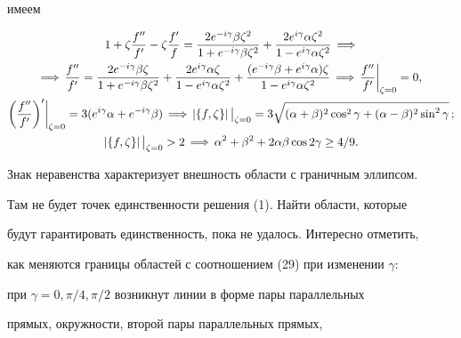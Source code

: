 имеем


\begin{gather}


1+\zeta\frac{f''}{f'}-\zeta\frac{f'}{f}=


\frac{2e^{-i\gamma}\beta\zeta^2}{1+e^{-i\gamma}\beta\zeta^2}+


\frac{2e^{i\gamma}\alpha\zeta^2}{1-e^{i\gamma}\alpha\zeta^2}


\,\Longrightarrow\, \notag\\


%


\Longrightarrow\,\frac{f''}{f'}=\frac{2e^{-i\gamma}\beta\zeta}


{1+e^{-i\gamma}\beta\zeta^2}+


\frac{2e^{i\gamma}\alpha\zeta}{1-e^{i\gamma}\alpha\zeta^2}+


\frac{(e^{-i\gamma}\beta+e^{i\gamma}\alpha)\zeta}


{1-e^{i\gamma}\alpha\zeta^2}\,\Longrightarrow\,


\frac{f''}{f'}\bigg|_{\zeta=0}=0, \notag \\


%


\biggl(\frac{f''}{f'} \biggr)'\bigg|_{\zeta=0}=


3(e^{i\gamma}\alpha+e^{-i\gamma}\beta)\,\Longrightarrow\,


|\{f,\zeta\}|\,\big|_{\zeta=0}=


3\sqrt{(\alpha+\beta)^2\cos^2\gamma+(\alpha-\beta)^2\sin^2\gamma}


\,;\notag \\


|\{f,\zeta\}|\,\big|_{\zeta=0}>2\,\Longrightarrow\,


\alpha^2+\beta^2+2\alpha\beta\cos 2\gamma\ge 4/9.


\end{gather}


Знак неравенства характеризует внешность области с граничным эллипсом.


Там не будет точек единственности решения (1). Найти области, которые


будут гарантировать единственность, пока не удалось. Интересно отметить,


как меняются границы областей с соотношением (29) при изменении $\gamma$:


при $\gamma=0,\pi/4,\pi/2$ возникнут линии в форме пары параллельных


прямых, окружности, второй пары параллельных прямых,


